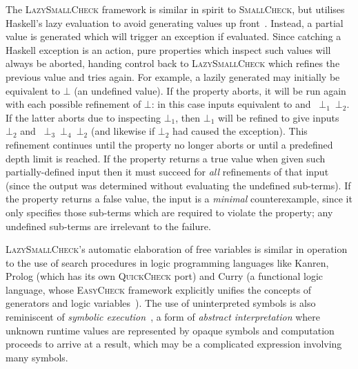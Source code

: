 The \textsc{LazySmallCheck} framework is similar in spirit to
\textsc{SmallCheck}, but utilises Haskell's lazy evaluation to avoid generating
values up front~\cite{reich2013advances}. Instead, a partial value is generated
which will trigger an exception if evaluated. Since catching a Haskell exception
is an  action, pure properties which inspect such values will always
be aborted, handing control back to \textsc{LazySmallCheck} which refines the
previous value and tries again. For example, a lazily generated  may
initially be equivalent to $\bot$ (an undefined value). If the property
aborts, it will be run again with each possible refinement of $\bot$: in this
case inputs equivalent to  and ~$\bot_1$~$\bot_2$. If
the latter aborts due to inspecting $\bot_1$, then $\bot_1$ will be refined to
give inputs ~$\bot_2$ and
~$\bot_3$~$\bot_4$\hs{)}~$\bot_2$ (and likewise if $\bot_2$
had caused the exception). This refinement continues until the property no
longer aborts or until a predefined depth limit is reached. If the property
returns a true value when given such partially-defined input then it must
succeed for \emph{all} refinements of that input (since the output was
determined without evaluating the undefined sub-terms). If the property returns
a false value, the input is a \emph{minimal} counterexample, since it only
specifies those sub-terms which are required to violate the property; any
undefined sub-terms are irrelevant to the failure.

\textsc{LazySmallCheck}'s automatic elaboration of free variables is similar in
operation to the use of search procedures in logic programming languages like
Kanren, Prolog (which has its own \textsc{QuickCheck} port) and Curry (a
functional logic language, whose \textsc{EasyCheck} framework explicitly
unifies the concepts of generators and logic
variables~\cite{christiansen2008easycheck}). The use of uninterpreted symbols
is also reminiscent of \emph{symbolic execution}~\cite{king1976symbolic}, a form
of \emph{abstract interpretation} where unknown runtime values are represented
by opaque symbols and computation proceeds to arrive at a result, which may be a
complicated expression involving many symbols.
